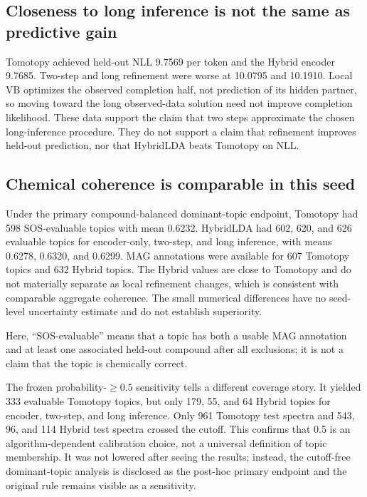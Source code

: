 \documentclass[11pt]{article}
\begin{document}
\subsection{Closeness to long inference is not the same as predictive gain}

Tomotopy achieved held-out NLL 9.7569 per token and the Hybrid encoder 9.7685.
Two-step and long refinement were worse at 10.0795 and 10.1910. Local VB
optimizes the observed completion half, not prediction of its hidden partner,
so moving toward the long observed-data solution need not improve completion
likelihood. These data support the claim that two steps approximate the chosen
long-inference procedure. They do not support a claim that refinement improves
held-out prediction, nor that HybridLDA beats Tomotopy on NLL.

\subsection{Chemical coherence is comparable in this seed}

Under the primary compound-balanced dominant-topic endpoint, Tomotopy had 598
SOS-evaluable topics with mean 0.6232. HybridLDA had 602, 620, and 626
evaluable topics for encoder-only, two-step, and long inference, with means
0.6278, 0.6320, and 0.6299. MAG annotations were available for 607 Tomotopy
topics and 632 Hybrid topics. The Hybrid values are close to Tomotopy and do
not materially separate as local refinement changes, which is consistent with comparable
aggregate coherence. The small numerical differences have no seed-level
uncertainty estimate and do not establish superiority.

Here, ``SOS-evaluable'' means that a topic has both a usable MAG annotation and
at least one associated held-out compound after all exclusions; it is not a
claim that the topic is chemically correct.

The frozen probability-$\geq0.5$ sensitivity tells a different coverage
story. It yielded 333 evaluable Tomotopy topics, but only 179, 55, and 64
Hybrid topics for encoder, two-step, and long inference. Only 961 Tomotopy test
spectra and 543, 96, and 114 Hybrid test spectra crossed the cutoff. This
confirms that 0.5 is an algorithm-dependent calibration choice, not a universal
definition of topic membership. It was not lowered after seeing the results;
instead, the cutoff-free dominant-topic analysis is disclosed as the post-hoc
primary endpoint and the original rule remains visible as a sensitivity.
\end{document}
